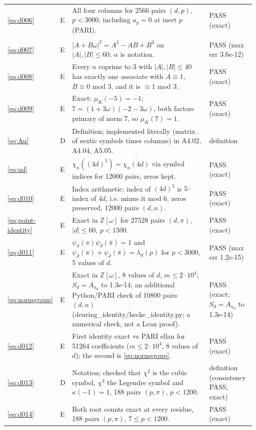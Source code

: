 \documentclass[11pt]{article}
\numberwithin{equation}{section}
\begin{document}
\begin{longtable}{@{}>{\raggedright\arraybackslash}p{1.2cm}>{\centering\arraybackslash}p{0.7cm}>{\raggedright\arraybackslash}p{9.05cm}>{\raggedright\arraybackslash}p{4.3cm}@{}}
\eqref{eq:d006} & E & All four columns for 2566 pairs $(d,p)$, $p<3000$, including $a_p=0$ at inert $p$ (PARI). & PASS (exact)\\
\multicolumn{4}{@{}l}{\emph{Section~3}}\\
\eqref{eq:d007} & E & $|A+B\omega|^2=A^2-AB+B^2$ on $|A|,|B|\le60$; $\alpha$ is notation. & PASS (max err 3.6e-12)\\
\eqref{eq:d008} & E & Every $n$ coprime to 3 with $|A|,|B|\le40$ has exactly one associate with $A\equiv1$, $B\equiv0$ mod 3, and it is $\equiv1$ mod 3. & PASS (exact)\\
\eqref{eq:d009} & E & Exact: $\mu_K(-5)=-1$; $7=(1+3\omega)(-2-3\omega)$, both factors primary of norm 7, so $\mu_K(7)=1$. & PASS (exact)\\
\eqref{eq:Au} & D & Definition; implemented literally (matrix of sextic symbols times columns) in A4.02, A4.04, A5.05. & definition\\
\eqref{eq:ud} & E & $\chi_n((4d)^5)=\overline{\chi_n(4d)}$ via symbol indices for 12000 pairs, zeros kept. & PASS (exact)\\
\eqref{eq:d010} & E & Index arithmetic: index of $(4d)^5$ is $5\cdot$index of $4d$, i.e. minus it mod 6, zeros preserved, 12000 pairs $(d,n)$. & PASS (exact)\\
\eqref{eq:point-identity} & E & Exact in $\mathbb Z[\omega]$ for 27528 pairs $(d,\pi)$, $|d|\le60$, $p<1500$. & PASS (exact)\\
\eqref{eq:d011} & E & $\psi_d(\pi)\psi_d(\bar\pi)=1$ and $\psi_d(\pi)+\psi_d(\bar\pi)=\lambda_d(p)$ for $p<3000$, 5 values of $d$. & PASS (max err 1.2e-15)\\
\eqref{eq:normgroup} & E & Exact in $\mathbb Z[\omega]$, 8 values of $d$, $m\le2\cdot10^4$; $S_d=A_{u_d}$ to 1.3e-14; an additional Python/PARI check of 10800 pairs $(d,n)$ (deuring\_identity/hecke\_identity.py; a numerical check, not a Lean proof). & PASS (exact; $S_d=A_{u_d}$ to 1.3e-14)\\
\eqref{eq:d012} & E & First identity exact vs PARI ellan for 51264 coefficients ($m\le2\cdot10^4$, 8 values of $d$); the second is \eqref{eq:normgroup}. & PASS (exact)\\
\eqref{eq:d013} & D & Notation; checked that $\chi^2$ is the cubic symbol, $\chi^3$ the Legendre symbol and $\kappa(-1)=1$, 188 pairs $(p,\pi)$, $p<1200$. & definition (consistency PASS, exact)\\
\eqref{eq:d014} & E & Both root counts exact at every residue, 188 pairs $(p,\pi)$, $7\le p<1200$. & PASS (exact)\\

\end{longtable}
\end{document}
